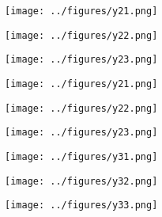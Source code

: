 \begin{otherlanguage}{ngerman}
\begin{samepage}
\begin{minipage}{\textwidth}
\vspace{0.125cm}

\begin{minipage}{0.05\textwidth}\centering{}\end{minipage}%
\begin{minipage}{0.3\textwidth}\centering\texttt{[image: ../figures/y21.png]}\end{minipage}%
\begin{minipage}{0.3\textwidth}\centering\texttt{[image: ../figures/y22.png]}\end{minipage}%
\begin{minipage}{0.3\textwidth}\centering\texttt{[image: ../figures/y23.png]}\end{minipage}

\vspace{0.125cm}

\begin{minipage}{0.05\textwidth}\centering{}\end{minipage}%
\begin{minipage}{0.3\textwidth}\centering\texttt{[image: ../figures/y21.png]}\end{minipage}%
\begin{minipage}{0.3\textwidth}\centering\texttt{[image: ../figures/y22.png]}\end{minipage}%
\begin{minipage}{0.3\textwidth}\centering\texttt{[image: ../figures/y23.png]}\end{minipage}

\vspace{0.125cm}

\begin{minipage}{0.05\textwidth}\centering{}\end{minipage}%
\begin{minipage}{0.3\textwidth}\centering\texttt{[image: ../figures/y31.png]}\end{minipage}%
\begin{minipage}{0.3\textwidth}\centering\texttt{[image: ../figures/y32.png]}\end{minipage}%
\begin{minipage}{0.3\textwidth}\centering\texttt{[image: ../figures/y33.png]}\end{minipage}


\end{minipage}
\end{samepage}
\end{otherlanguage}
